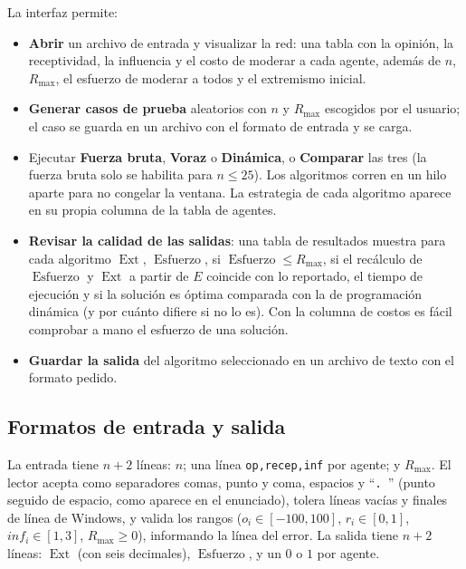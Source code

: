 \documentclass[11pt,letterpaper]{article}
\newcommand{\Ext}{\operatorname{Ext}}
\newcommand{\Esf}{\operatorname{Esfuerzo}}
\newcommand{\Rmax}{R_{\max}}
\begin{document}
La interfaz permite:
\begin{itemize}
  \item \textbf{Abrir} un archivo de entrada y visualizar la red: una tabla
        con la opinión, la receptividad, la influencia y el costo de moderar
        a cada agente, además de $n$, $\Rmax$, el esfuerzo de moderar a todos
        y el extremismo inicial.
  \item \textbf{Generar casos de prueba} aleatorios con $n$ y $\Rmax$
        escogidos por el usuario; el caso se guarda en un archivo con el
        formato de entrada y se carga.
  \item Ejecutar \textbf{Fuerza bruta}, \textbf{Voraz} o \textbf{Dinámica}, o
        \textbf{Comparar} las tres (la fuerza bruta solo se habilita para
        $n \le 25$). Los algoritmos corren en un hilo aparte para no congelar
        la ventana. La estrategia de cada algoritmo aparece en su propia
        columna de la tabla de agentes.
  \item \textbf{Revisar la calidad de las salidas}: una tabla de resultados
        muestra para cada algoritmo $\Ext$, $\Esf$, si $\Esf \le \Rmax$, si
        el recálculo de $\Esf$ y $\Ext$ a partir de $E$ coincide con lo
        reportado, el tiempo de ejecución y si la solución es óptima
        comparada con la de programación dinámica (y por cuánto difiere si
        no lo es). Con la columna de costos es fácil comprobar a mano el
        esfuerzo de una solución.
  \item \textbf{Guardar la salida} del algoritmo seleccionado en un archivo
        de texto con el formato pedido.
\end{itemize}

\subsection{Formatos de entrada y salida}

La entrada tiene $n+2$ líneas: $n$; una línea
\texttt{op,recep,inf} por agente; y $\Rmax$. El lector acepta como
separadores comas, punto y coma, espacios y ``\texttt{.~}'' (punto seguido de
espacio, como aparece en el enunciado), tolera líneas vacías y finales de
línea de Windows, y valida los rangos ($o_i \in [-100,100]$,
$r_i \in [0,1]$, $inf_i \in [1,3]$, $\Rmax \ge 0$), informando la línea del
error. La salida tiene $n+2$ líneas: $\Ext$ (con seis decimales), $\Esf$, y
un $0$ o $1$ por agente.

\end{document}
